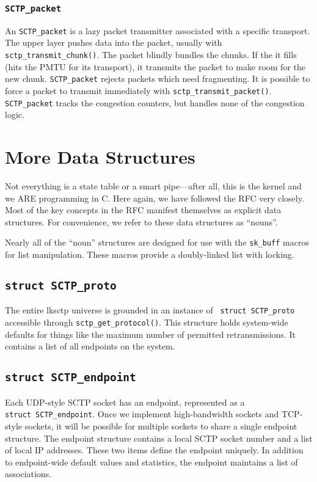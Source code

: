 \documentclass[twocolumn]{article}
\begin{document}
\subsubsection{\texttt{SCTP\_packet}}

An \texttt{SCTP\_packet} is a lazy packet transmitter associated with a
specific transport.  The upper layer pushes data into the packet,
usually with \texttt{sctp\_transmit\_chunk()}.  The packet blindly
bundles the chunks.  If the it fills (hits the PMTU for its transport),
it transmits the packet to make room for the new chunk.
\texttt{SCTP\_packet} rejects packets which need fragmenting.  It is
possible to force a packet to transmit immediately with
\texttt{sctp\_transmit\_packet()}.  \texttt{SCTP\_packet} tracks the
congestion counters, but handles none of the congestion logic.

\section{More Data Structures}

Not everything is a state table or a smart pipe---after all, this is
the kernel and we ARE programming in C.  Here again, we have followed
the RFC very closely.  Most of the key concepts in the RFC manifest
themselves as explicit data structures.  For convenience, we refer to
these data structures as ``nouns''.

Nearly all of the ``noun'' structures are designed for use with the
\texttt{sk\_buff} macros for list manipulation.  These macros provide a
doubly-linked list with locking.

\subsection{\texttt{struct~SCTP\_proto}}

The entire lksctp universe is grounded in an instance of \texttt{
struct~SCTP\_proto} accessible through \texttt{sctp\_get\_protocol()}.
This structure holds system-wide defaults for things like the maximum
number of permitted retransmissions.  It contains a list of all
endpoints on the system.

\subsection{\texttt{struct~SCTP\_endpoint}}

Each UDP-style SCTP socket has an endpoint, represented as a
\texttt{struct~SCTP\_endpoint}.  Once we implement high-bandwidth sockets and
TCP-style sockets, it will be possible for multiple sockets to share a
single endpoint structure.  The endpoint structure contains a local
SCTP socket number and a list of local IP addresses.  These two items
define the endpoint uniquely.  In addition to endpoint-wide default
values and statistics, the endpoint maintains a list of associations.
\end{document}
